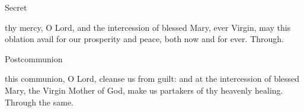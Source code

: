 \begin{inhead}
    Secret
\end{inhead}
 thy mercy, O Lord, and the intercession of blessed Mary, ever Virgin, may this oblation avail for our prosperity and peace, both now and for ever. Through.
\begin{inhead}
    Postcommunion
\end{inhead}
 this communion, O Lord, cleanse us from guilt: and at the intercession of blessed Mary, the Virgin Mother of God, make us partakers of thy heavenly healing. Through the same.


